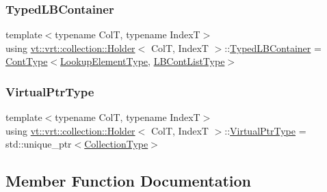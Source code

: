 \mbox{\label{structvt_1_1vrt_1_1collection_1_1_holder_a9738cadcf89ace9c3d0c23990e4f919e}} 
\subsubsection{\texorpdfstring{Typed\+L\+B\+Container}{TypedLBContainer}}
{\footnotesize\ttfamily template$<$typename ColT, typename IndexT$>$ \\
using \hyperlink{structvt_1_1vrt_1_1collection_1_1_holder}{vt\+::vrt\+::collection\+::\+Holder}$<$ ColT, IndexT $>$\+::\hyperlink{structvt_1_1vrt_1_1collection_1_1_holder_a9738cadcf89ace9c3d0c23990e4f919e}{Typed\+L\+B\+Container} =  \hyperlink{structvt_1_1vrt_1_1collection_1_1_holder_ae3bb115b69cf47e14a4e8441cebe9142}{Cont\+Type}$<$\hyperlink{structvt_1_1vrt_1_1collection_1_1_holder_a3206c3e5eb5d6deb4667409222163b77}{Lookup\+Element\+Type}, \hyperlink{structvt_1_1vrt_1_1collection_1_1_holder_af26a59243dd4e1a86d8fcf320a8dc463}{L\+B\+Cont\+List\+Type}$>$}

\mbox{\label{structvt_1_1vrt_1_1collection_1_1_holder_a04ba57a7b2c48ce6b4c90d3f3b33f43c}} 
\subsubsection{\texorpdfstring{Virtual\+Ptr\+Type}{VirtualPtrType}}
{\footnotesize\ttfamily template$<$typename ColT, typename IndexT$>$ \\
using \hyperlink{structvt_1_1vrt_1_1collection_1_1_holder}{vt\+::vrt\+::collection\+::\+Holder}$<$ ColT, IndexT $>$\+::\hyperlink{structvt_1_1vrt_1_1collection_1_1_holder_a04ba57a7b2c48ce6b4c90d3f3b33f43c}{Virtual\+Ptr\+Type} =  std\+::unique\+\_\+ptr$<$\hyperlink{structvt_1_1vrt_1_1collection_1_1_holder_a38b4a4bfc4408cf28918c32433c80aac}{Collection\+Type}$>$}



\subsection{Member Function Documentation}
\mbox{\label{structvt_1_1vrt_1_1collection_1_1_holder_a9f0e6df0202f45cdfb8b190fbce86141}} 
